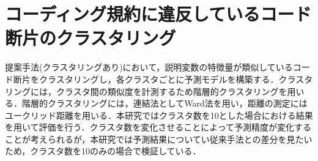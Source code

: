\documentclass[11pt,dvipdfmx]{jreport}
\begin{document}


\begin{table}[t]
    \centering
    \caption{正例と負例の分類}
    \label{tab:pos_neg}
\end{table}

\section{コーディング規約に違反しているコード断片のクラスタリング}


提案手法(クラスタリングあり)において，説明変数の特徴量が類似しているコード断片をクラスタリングし，各クラスタごとに予測モデルを構築する．クラスタリングには，クラスタ間の類似度を計測するため階層的クラスタリングを用いる．階層的クラスタリングには，連結法としてWard法を用い，距離の測定にはユークリッド距離を用いる．本研究ではクラスタ数を10とした場合における結果を用いて評価を行う．クラスタ数を変化させることによって予測精度が変化することが考えられるが，本研究では予測結果についてい従来手法との差分を見たいため，クラスタ数を10のみの場合で検証している．

\end{document}
